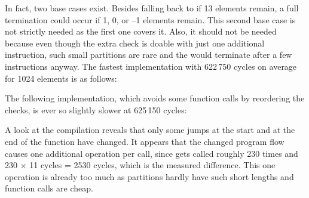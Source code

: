 In fact, two base cases exist.
Besides falling back to \IS{} if 13 elements remain, a full termination could occur if 1, 0, or --1 elements remain.
This second base case is not strictly needed as the first one covers it.
Also, it should not be needed because even though the extra check is doable with just one additional instruction, such small partitions are rare and the \IS{} would terminate after a few instructions anyway.
The fastest implementation with 622\,750 cycles on average for 1024 elements is as follows:
The following implementation, which avoids some function calls by reordering the checks, is ever so slightly slower at 625\,150 cycles:
A look at the compilation reveals that only some jumps at the start and at the end of the function have changed.
It appears that the changed program flow causes one additional operation per call, since \QS{} gets called roughly 230 times and 230 × 11 cycles = 2530 cycles, which is the measured difference.
This one operation is already too much as partitions hardly have such short lengths and function calls are cheap.

